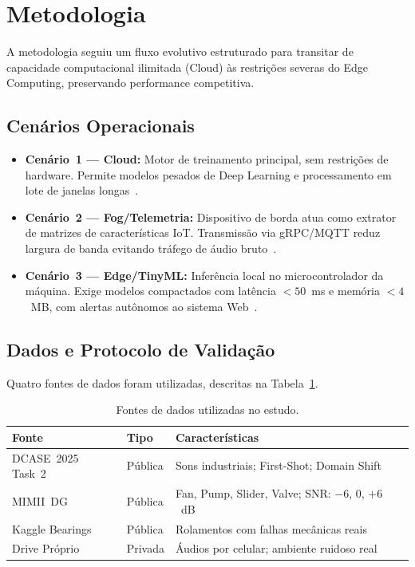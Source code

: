 \section{Metodologia}
\color{black}

A metodologia seguiu um fluxo evolutivo estruturado para transitar de capacidade computacional ilimitada
(Cloud) às restrições severas do Edge Computing, preservando performance competitiva.

\subsection{Cenários Operacionais}

\begin{itemize}
    \item \textbf{Cenário~1 --- Cloud:} Motor de treinamento principal, sem restrições de hardware.
    Permite modelos pesados de Deep Learning e processamento em lote de janelas longas~\cite{Le2025,
    Zhang2026}.
    \item \textbf{Cenário~2 --- Fog/Telemetria:} Dispositivo de borda atua como extrator de matrizes
    de características IoT. Transmissão via gRPC/MQTT reduz largura de banda evitando tráfego de
    áudio bruto~\cite{Uzel2026}.
    \item \textbf{Cenário~3 --- Edge/TinyML:} Inferência local no microcontrolador da máquina.
    Exige modelos compactados com latência $<50$~ms e memória $<4$~MB, com alertas autônomos ao
    sistema Web~\cite{Khamaisi2025}.
\end{itemize}

\subsection{Dados e Protocolo de Validação}

Quatro fontes de dados foram utilizadas, descritas na Tabela~\ref{tab:fontes_dados}.

\begin{table}[H]
\centering
\footnotesize
\begin{tabularx}{\columnwidth}{@{} l X X @{}}
\toprule
\textbf{Fonte} & \textbf{Tipo} & \textbf{Características} \\ \midrule
DCASE~2025 Task~2 & Pública & Sons industriais; First-Shot; Domain Shift~\cite{Nishida2025} \\
MIMII~DG & Pública & Fan, Pump, Slider, Valve; SNR: $-6$, 0, $+6$~dB~\cite{Dohi2022} \\
Kaggle Bearings & Pública & Rolamentos com falhas mecânicas reais \\
Drive Próprio & Privada & Áudios por celular; ambiente ruidoso real \\ \bottomrule
\end{tabularx}
\caption{Fontes de dados utilizadas no estudo.}
\label{tab:fontes_dados}
\end{table}

